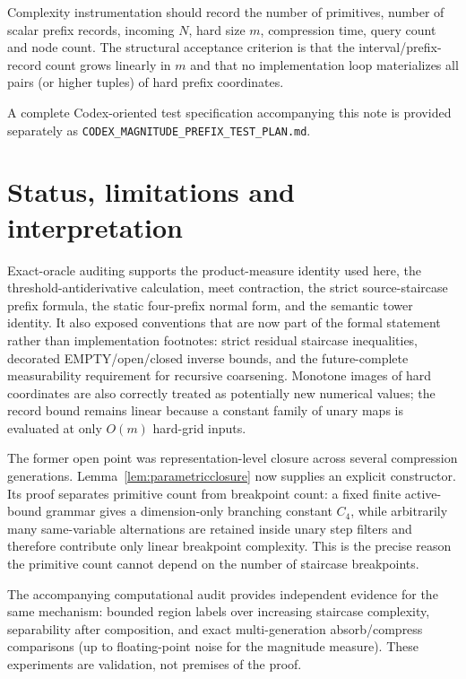 \documentclass[12pt,a4paper]{article}
\theoremstyle{definition}
\newcommand{\1}{\mathbf 1}
\begin{document}
Complexity instrumentation should record the number of primitives, number of scalar prefix records, incoming $N$, hard size $m$, compression time, query count and node count. The structural acceptance criterion is that the interval/prefix-record count grows linearly in $m$ and that no implementation loop materializes all pairs (or higher tuples) of hard prefix coordinates.

A complete Codex-oriented test specification accompanying this note is provided separately as \texttt{CODEX\_MAGNITUDE\_PREFIX\_TEST\_PLAN.md}.

\section{Status, limitations and interpretation}

Exact-oracle auditing supports the product-measure identity used here, the threshold-antiderivative calculation, meet contraction, the strict source-staircase prefix formula, the static four-prefix normal form, and the semantic tower identity.  It also exposed conventions that are now part of the formal statement rather than implementation footnotes: strict residual staircase inequalities, decorated EMPTY/open/closed inverse bounds, and the future-complete measurability requirement for recursive coarsening.  Monotone images of hard coordinates are also correctly treated as potentially new numerical values; the record bound remains linear because a constant family of unary maps is evaluated at only $O(m)$ hard-grid inputs.

The former open point was representation-level closure across several compression generations.  Lemma~\ref{lem:parametricclosure} now supplies an explicit constructor.  Its proof separates primitive count from breakpoint count: a fixed finite active-bound grammar gives a dimension-only branching constant $C_4$, while arbitrarily many same-variable alternations are retained inside unary step filters and therefore contribute only linear breakpoint complexity.  This is the precise reason the primitive count cannot depend on the number of staircase breakpoints.

The accompanying computational audit provides independent evidence for the same mechanism: bounded region labels over increasing staircase complexity, separability after composition, and exact multi-generation absorb/compress comparisons (up to floating-point noise for the magnitude measure).  These experiments are validation, not premises of the proof.
\end{document}
